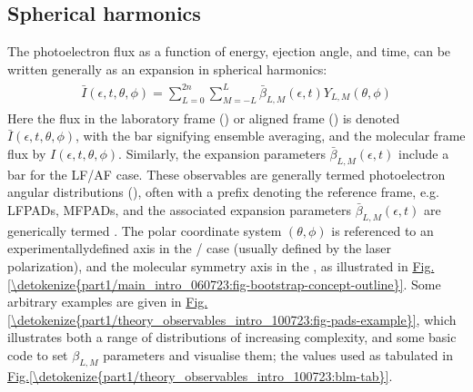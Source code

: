 \documentclass[letterpaper,table,10pt,english]{jupyterBook}
\begin{document}
\subsection{Spherical harmonics}
\label{\detokenize{part1/theory_observables_intro_100723:spherical-harmonics}}\label{\detokenize{part1/theory_observables_intro_100723:sec-theory-sph-harm-intro}}
\sphinxAtStartPar
The photoelectron flux as a function of energy, ejection angle, and time, can be written generally as an expansion in spherical harmonics:
\begin{equation}\label{equation:part1/theory_observables_intro_100723:eq:AF-PAD-general}
\begin{split}
\begin{align}
\bar{I}(\epsilon,t,\theta,\phi)=\sum_{L=0}^{2n}\sum_{M=-L}^{L}\bar{\beta}_{L,M}(\epsilon,t)Y_{L,M}(\theta,\phi)
\end{align}
\end{split}
\end{equation}
\sphinxAtStartPar
Here the flux in the laboratory frame ({\hyperref[\detokenize{backmatter/glossary:term-LF}]{}}) or aligned frame ({\hyperref[\detokenize{backmatter/glossary:term-AF}]{}}) is denoted \(\bar{I}(\epsilon,t,\theta,\phi)\), with the bar signifying ensemble averaging, and the molecular frame flux by \(I(\epsilon,t,\theta,\phi)\). Similarly, the expansion parameters \(\bar{\beta}_{L,M}(\epsilon,t)\) include a bar for the LF/AF case. These observables are generally termed photoelectron angular distributions ({\hyperref[\detokenize{backmatter/glossary:term-PADs}]{}}), often with a prefix denoting the reference frame, e.g. LFPADs, MFPADs, and the associated expansion parameters \(\bar{\beta}_{L,M}(\epsilon,t)\) are generically termed {\hyperref[\detokenize{backmatter/glossary:term-anisotropy-paramters}]{}}. The polar coordinate system \((\theta,\phi)\) is referenced to
an experimentally\sphinxhyphen{}defined axis in the {\hyperref[\detokenize{backmatter/glossary:term-LF}]{}}/{\hyperref[\detokenize{backmatter/glossary:term-AF}]{}} case (usually defined by the laser polarization), and the molecular symmetry axis in the {\hyperref[\detokenize{backmatter/glossary:term-MF}]{}}, as illustrated in \hyperref[\detokenize{part1/main_intro_060723:fig-bootstrap-concept-outline}]{Fig.\@ \ref{\detokenize{part1/main_intro_060723:fig-bootstrap-concept-outline}}}. Some arbitrary examples are given in \hyperref[\detokenize{part1/theory_observables_intro_100723:fig-pads-example}]{Fig.\@ \ref{\detokenize{part1/theory_observables_intro_100723:fig-pads-example}}}, which illustrates both a range of distributions of increasing complexity, and some basic code to set \(\beta_{L,M}\) parameters and visualise them; the values used as tabulated in  \hyperref[\detokenize{part1/theory_observables_intro_100723:blm-tab}]{Fig.\@ \ref{\detokenize{part1/theory_observables_intro_100723:blm-tab}}}.
\end{document}
